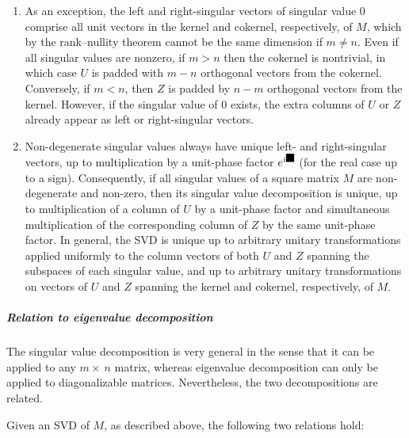 \documentclass[aps,preprint]{revtex4}%
\providecommand{\U}[1]{\protect\rule{.1in}{.1in}}
\begin{document}
\begin{enumerate}
\item As an exception, the left and right-singular vectors of singular value
$0$ comprise all unit vectors in the kernel and cokernel, respectively, of
$M$, which by the rank--nullity theorem cannot be the same dimension if $m\neq
n$. Even if all singular values are nonzero, if $m>n$ then the cokernel is
nontrivial, in which case $U$ is padded with $m-n$ orthogonal vectors from the
cokernel. Conversely, if $m<n$, then $Z$ is padded by $n-m$ orthogonal vectors
from the kernel. However, if the singular value of $0$ exists, the extra
columns of $U$ or $Z$ already appear as left or right-singular vectors.

\item Non-degenerate singular values always have unique left- and
right-singular vectors, up to multiplication by a unit-phase factor
$e^{i\U{3c6} }$ (for the real case up to a sign). Consequently, if all
singular values of a square matrix $M$ are non-degenerate and non-zero, then
its singular value decomposition is unique, up to multiplication of a column
of $U$ by a unit-phase factor and simultaneous multiplication of the
corresponding column of $Z$ by the same unit-phase factor. In general, the SVD
is unique up to arbitrary unitary transformations applied uniformly to the
column vectors of both $U$ and $Z$ spanning the subspaces of each singular
value, and up to arbitrary unitary transformations on vectors of $U$ and $Z$
spanning the kernel and cokernel, respectively, of $M$.
\end{enumerate}

\subparagraph{Relation to eigenvalue decomposition}

The singular value decomposition is very general in the sense that it can be
applied to any $m\times\ n$ matrix, whereas eigenvalue decomposition can only
be applied to diagonalizable matrices. Nevertheless, the two decompositions
are related.

Given an SVD of $M$, as described above, the following two relations hold:
\end{document}
